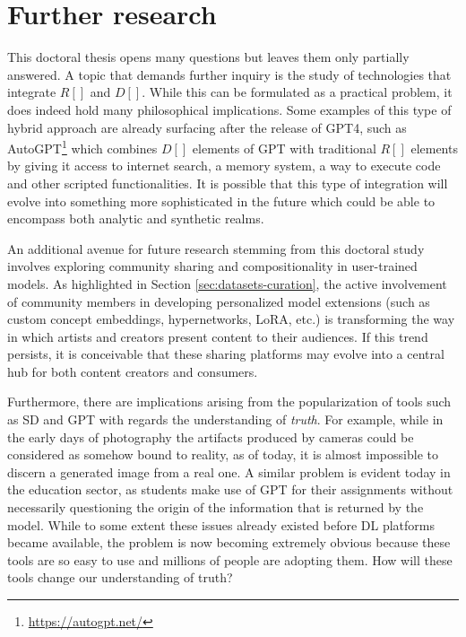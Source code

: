 \section{Further research}

This doctoral thesis opens many questions but leaves them only partially answered. A topic that demands further inquiry is the study of technologies that integrate $R[]$ and $D[]$. While this can be formulated as a practical problem, it does indeed hold many philosophical implications. Some examples of this type of hybrid approach are already surfacing after the release of GPT4, such as AutoGPT\footnote{\url{https://autogpt.net/}} which combines $D[]$ elements of GPT with traditional $R[]$ elements by giving it access to internet search, a memory system, a way to execute code and other scripted functionalities. It is possible that this type of integration will evolve into something more sophisticated in the future which could be able to encompass both analytic and synthetic realms. 

An additional avenue for future research stemming from this doctoral study involves exploring community sharing and compositionality in user-trained models. As highlighted in Section \ref{sec:datasets-curation}, the active involvement of community members in developing personalized model extensions (such as custom concept embeddings, hypernetworks, LoRA, etc.) is transforming the way in which artists and creators present content to their audiences. If this trend persists, it is conceivable that these sharing platforms may evolve into a central hub for both content creators and consumers.

Furthermore, there are implications arising from the popularization of tools such as SD and GPT with regards the understanding of \emph{truth}. For example, while in the early days of photography the artifacts produced by cameras could be considered as somehow bound to reality, as of today, it is almost impossible to discern a generated image from a real one. A similar problem is evident today in the education sector, as students make use of GPT for their assignments without necessarily questioning the origin of the information that is returned by the model. While to some extent these issues already existed before DL platforms became available, the problem is now becoming extremely obvious because these tools are so easy to use and millions of people are adopting them. How will these tools change our understanding of truth?

